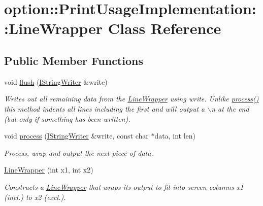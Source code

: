 \hypertarget{classoption_1_1_print_usage_implementation_1_1_line_wrapper}{\section{option\-:\-:\-Print\-Usage\-Implementation\-:\-:\-Line\-Wrapper \-Class \-Reference}
\label{classoption_1_1_print_usage_implementation_1_1_line_wrapper}
}
\subsection*{\-Public \-Member \-Functions}
\begin{DoxyCompactItemize}
\item 
\hypertarget{classoption_1_1_print_usage_implementation_1_1_line_wrapper_a9383db9fd3fb18ce091db63ce0b149fd}{void \hyperlink{classoption_1_1_print_usage_implementation_1_1_line_wrapper_a9383db9fd3fb18ce091db63ce0b149fd}{flush} (\hyperlink{structoption_1_1_print_usage_implementation_1_1_i_string_writer}{\-I\-String\-Writer} \&write)}\label{classoption_1_1_print_usage_implementation_1_1_line_wrapper_a9383db9fd3fb18ce091db63ce0b149fd}

\begin{DoxyCompactList}\small\item\em \-Writes out all remaining data from the \hyperlink{classoption_1_1_print_usage_implementation_1_1_line_wrapper}{\-Line\-Wrapper} using {\ttfamily write}. \-Unlike \hyperlink{classoption_1_1_print_usage_implementation_1_1_line_wrapper_add20eca40865ad892d6c28b412ac14d5}{process()} this method indents all lines including the first and will output a $\backslash$n at the end (but only if something has been written). \end{DoxyCompactList}\item 
void \hyperlink{classoption_1_1_print_usage_implementation_1_1_line_wrapper_add20eca40865ad892d6c28b412ac14d5}{process} (\hyperlink{structoption_1_1_print_usage_implementation_1_1_i_string_writer}{\-I\-String\-Writer} \&write, const char $\ast$data, int len)
\begin{DoxyCompactList}\small\item\em \-Process, wrap and output the next piece of data. \end{DoxyCompactList}\item 
\hyperlink{classoption_1_1_print_usage_implementation_1_1_line_wrapper_a288f16b6e928e9f54f48e13ff6817e95}{\-Line\-Wrapper} (int x1, int x2)
\begin{DoxyCompactList}\small\item\em \-Constructs a \hyperlink{classoption_1_1_print_usage_implementation_1_1_line_wrapper}{\-Line\-Wrapper} that wraps its output to fit into screen columns {\ttfamily x1} (incl.) to {\ttfamily x2} (excl.). \end{DoxyCompactList}\end{DoxyCompactItemize}


